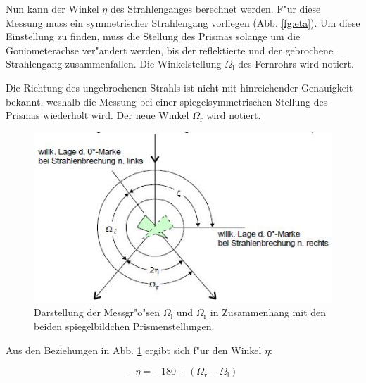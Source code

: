 	Nun kann der Winkel $\eta$ des Strahlenganges berechnet werden.
	F"ur diese Messung muss ein symmetrischer Strahlengang vorliegen (Abb. \ref{fg:eta}).
	Um diese Einstellung zu finden, muss die Stellung des Prismas solange um die Goniometerachse ver"andert werden, bis der reflektierte und der gebrochene Strahlengang zusammenfallen. Die Winkelstellung $\Omega_\mathrm{l}$ des Fernrohrs wird notiert.

	Die Richtung des ungebrochenen Strahls ist nicht mit hinreichender Genauigkeit bekannt, weshalb die Messung bei einer spiegelsymmetrischen Stellung des Prismas wiederholt wird. Der neue Winkel $\Omega_\mathrm{r}$ wird notiert.

	\begin{figure}[!h]
		\centering
		\includegraphics[width = 12cm]{img/omega.JPG}
		\caption{Darstellung der Messgr"o"sen $\Omega_\mathrm{l}$ und $\Omega_\mathrm{r}$ in Zusammenhang mit den beiden spiegelbildchen Prismenstellungen. \cite{anleitung}}
		\label{omega}
	\end{figure}

	Aus den Beziehungen in Abb. \ref{omega} ergibt sich f"ur den Winkel $\eta$:

	\begin{equation}
		-\eta = - 180 + (\Omega_\mathrm{r} - \Omega_\mathrm{l}) \label{eqn:eta}
	\end{equation}
